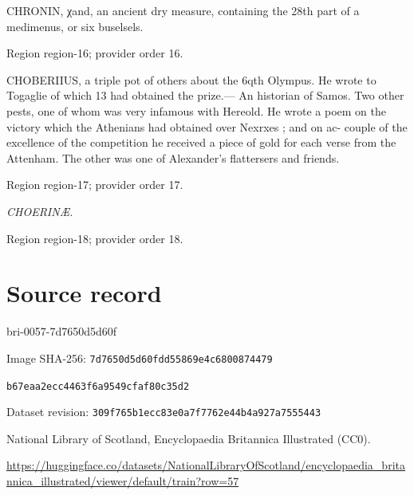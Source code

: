 \documentclass[11pt]{article}
\begin{document}
CHRONIN, χand, an ancient dry measure, containing the 28th part of a medimenus, or six buselsels.
\par

{\scriptsize\color{gray} Region region-16; provider order 16.\par}
\medskip

CHOBERIIUS, a triple pot of others about the 6qth Olympus. He wrote to Togaglie of which 13 had obtained the prize.— An historian of Samos. Two other pests, one of whom was very infamous with Hereold. He wrote a poem on the victory which the Athenians had obtained over Nexrxes ; and on ac- couple of the excellence of the competition he received a piece of gold for each verse from the Attenham. The other was one of Alexander's flattersers and friends.
\par

{\scriptsize\color{gray} Region region-17; provider order 17.\par}
\medskip

{\small\itshape CHOERINÆ.\par}

{\scriptsize\color{gray} Region region-18; provider order 18.\par}
\medskip
\newpage\section*{Source record}
bri-0057-7d7650d5d60f\par
Image SHA-256: \texttt{7d7650d5d60fdd55869e4c6800874479}\par\texttt{b67eaa2ecc4463f6a9549cfaf80c35d2}\par
Dataset revision: \texttt{309f765b1ecc83e0a7f7}\texttt{762e44b4a927a7555443}\par
National Library of Scotland, Encyclopaedia Britannica Illustrated (CC0).\par
\url{https://huggingface.co/datasets/NationalLibraryOfScotland/encyclopaedia_britannica_illustrated/viewer/default/train?row=57}
\end{document}
